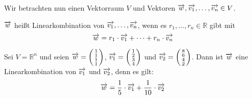 %
%
%
%

Wir betrachten nun  einen Vektorraum $V$  und Vektoren $\overrightarrow{w}, \overrightarrow{v_1}, \ldots, 
\overrightarrow{v_n} \in V$.

\begin{definition}\label{vectorraum_lin_comp_fin} $\overrightarrow{w}$ heißt 
Linearkombination von $\overrightarrow{v_1}, \ldots , \overrightarrow{v_n}$, wenn es 
$r_1, \ldots , r_n \in \mathbb R$ gibt mit 
  	$$ \overrightarrow{w} = r_1 \cdot \overrightarrow{v_1} + \cdots + r_n \cdot \overrightarrow{v_n} $$
\end{definition}

\begin{beispiel} Sei $V = \mathbb R^n$ und seien $\overrightarrow{w} = 
\left( \begin{smallmatrix} 1 \\ 1 \\ 1 \\ 1 \end{smallmatrix}  \right)$, 
$\overrightarrow{v_1} = \left( \begin{smallmatrix} 1 \\ 2 \\ 3 \\ 4 \end{smallmatrix} 
\right)$ und  $\overrightarrow{v_2} =
\left( \begin{smallmatrix} 8 \\ 6 \\ 4 \\ 2 \end{smallmatrix} \right)$. Dann ist 
$\overrightarrow{w}$ eine Linearkombination von $\overrightarrow{v_1}$ und 
$\overrightarrow{v_2}$, denn es gilt:
  	$$ \overrightarrow{w} = \frac {1}{5} \cdot \overrightarrow{v_1} + \frac {1}{10} \cdot \overrightarrow{v_2} $$
\end{beispiel}

